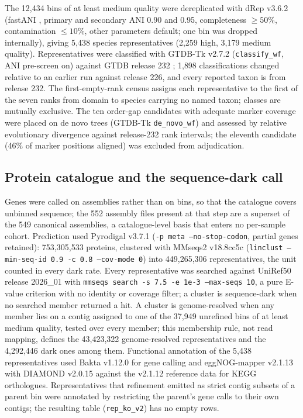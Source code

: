 \documentclass[11pt]{article}
\begin{document}
The 12{,}434 bins of at least medium quality were dereplicated with dRep v3.6.2 \citep{olm2017drep}
(fastANI \citep{jain2018fastani}, primary and secondary ANI 0.90 and 0.95, completeness $\geq 50\%$,
contamination $\leq 10\%$, other parameters default; one bin was dropped internally), giving 5{,}438
species representatives (2{,}259 high, 3{,}179 medium quality). Representatives were classified with
GTDB-Tk v2.7.2 \citep{chaumeil2022gtdbtk} (\texttt{classify\_wf}, ANI pre-screen on) against GTDB
release 232 \citep{parks2022gtdb}; 1{,}898 classifications changed relative to an earlier run
against release 226, and every reported taxon is from release 232. The first-empty-rank census
assigns each representative to the first of the seven ranks from domain to species carrying no named
taxon; classes are mutually exclusive. The ten order-gap candidates with adequate marker coverage
were placed on de novo trees (GTDB-Tk \texttt{de\_novo\_wf}) and assessed by relative evolutionary
divergence against release-232 rank intervals; the eleventh candidate (46\% of marker positions
aligned) was excluded from adjudication.

\subsection*{Protein catalogue and the sequence-dark call}
Genes were called on assemblies rather than on bins, so that the catalogue covers unbinned sequence;
the 552 assembly files present at that step are a superset of the 549 canonical assemblies, a
catalogue-level basis that enters no per-sample cohort. Prediction used Pyrodigal v3.7.1 \citep{larralde2022pyrodigal,hyatt2010prodigal}
(\texttt{-p meta --no-stop-codon}, partial genes retained): 753{,}305{,}533 proteins, clustered with
MMseqs2 v18.8cc5c \citep{steinegger2017mmseqs2,steinegger2018linclust} (\texttt{linclust
--min-seq-id 0.9 -c 0.8 --cov-mode 0}) into 449{,}265{,}306 representatives, the unit counted in
every dark rate. Every representative was searched against UniRef50 release 2026\_01
\citep{suzek2015uniref} with \texttt{mmseqs search -s 7.5 -e 1e-3 --max-seqs 10}, a pure E-value
criterion with no identity or coverage filter; a cluster is sequence-dark when no searched member
returned a hit. A cluster is genome-resolved when any member lies on a contig assigned to one of the
37{,}949 unrefined bins of at least medium quality, tested over every member; this membership rule,
not read mapping, defines the 43{,}423{,}322 genome-resolved representatives and the 4{,}292{,}446
dark ones among them. Functional annotation of the 5{,}438 representatives used Bakta v1.12.0
\citep{schwengers2021bakta} for gene calling and eggNOG-mapper v2.1.13 \citep{cantalapiedra2021eggnog}
with DIAMOND v2.0.15 \citep{buchfink2021diamond} against the v2.1.12 reference data for KEGG
orthologues. Representatives that refinement emitted as strict contig subsets of a parent bin were
annotated by restricting the parent's gene calls to their own contigs; the resulting table
(\texttt{rep\_ko\_v2}) has no empty rows.
\end{document}
